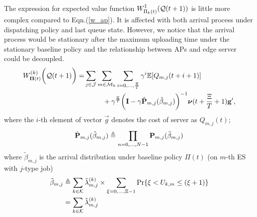 The expression for expected value function $W^{\ddagger}_{\Pi_{k}(t)}(\mathcal{Q}(t+1))$ is little more complex compared to Eqn.(\ref{w_ap}).
It is affected with both arrival process under dispatching policy and last queue state.
However, we notice that the arrival process would be stationary after the maximum uploading time under the stationary baseline policy and the relationship between APs and edge server could be decoupled.
\begin{align}
    W^{(k)}_{\boldsymbol{\Pi}(t)}\bigg(\mathcal{Q}(t+1)\bigg)
    =& \sum_{j\in\mathcal{J}}\sum_{m\in\mathcal{M}_{k}}\sum_{i=0,\dots,\frac{\Xi}{T}} \gamma^{i} \mathbb{E}[ Q_{m,j}({t+i+1}) ]
    \nonumber\\
    &~~~~~~~~+ \gamma^{\frac{\Xi}{T}} \bigg( \mathbf{I} - \gamma \hat{\mathbf{P}}_{m,j}(\tilde{\beta}_{m,j}) \bigg)^{-1} \boldsymbol{\nu}({t+\frac{\Xi}{T}+1}) \mathbf{g}',
\end{align}
where the $i$-th element of vector $\vec{g}$ denotes the cost of server as $Q_{m,j}(t)$;
\begin{align}
    \hat{\mathbf{P}}_{m,j}(\tilde{\beta}_{m,j}) \triangleq \prod_{n=0,\dots,N-1} \mathbf{P}_{m,j}(\tilde{\beta}_{m,j})
\end{align}
where $\tilde{\beta}_{m,j}$ is the arrival distribution under baseline policy $\Pi(t)$ (on $m$-th ES with $j$-type job)
\begin{align}
    \tilde{\beta}_{m,j} &\triangleq \sum_{k\in\mathcal{K}} \tilde{\lambda}^{(k)}_{m,j} \times \sum_{\xi=0,\dots,\Xi-1} \Pr\{ \xi<U_{k,m}\leq(\xi+1) \}
        \nonumber\\
    ~~~~&= \sum_{k\in\mathcal{K}} \tilde{\lambda}^{(k)}_{m,j}
\end{align}

